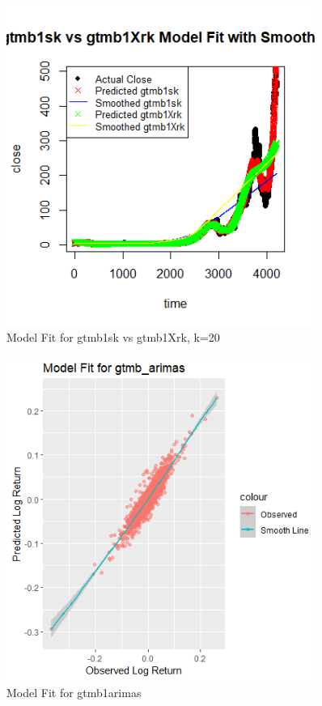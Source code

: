 \begin{figure}[h]
    \centering
    \includegraphics[width=0.9\textwidth]{visuals/ModelFitgtmb1sk.png}
    \caption{Model Fit for gtmb1sk vs gtmb1Xrk, k=20}
    \label{fig:modfitgtmb7}
\end{figure}



\begin{figure}[h]
    \centering
    \includegraphics[width=0.9\textwidth]{visuals/ModelFitgtmb_arimas.png}
    \caption{Model Fit for gtmb1arimas}
    \label{fig:modfitgtmb7}
\end{figure}



\newpage